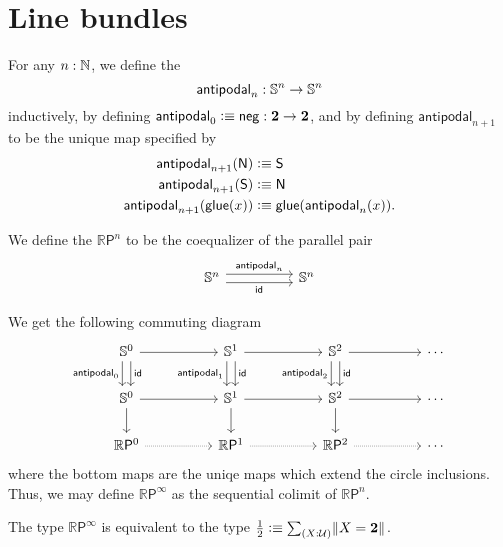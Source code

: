 \documentclass{article}
\newcommand{\projective}[1]{\mathbb{R}\mathsf{P}^{#1}}
\newcommand{\antipodal}[1]{\mathsf{antipodal}_{#1}}
\begin{document}
\section{Line bundles}

\begin{defn}
For any $n:\mathbb{N}$, we define the  
\begin{equation*}
\antipodal{n}:\Sn^n\to\Sn^n
\end{equation*} 
inductively, by defining $\antipodal{0}\defeq\mathsf{neg}:\bool\to\bool$, and by defining
$\antipodal{n+1}$ to be the unique map specified by
\begin{align*}
\antipodal{n+1}(\north) & \defeq\south \\
\antipodal{n+1}(\south) & \defeq\north \\
\ap{\antipodal{n+1}}{\glue(x)} & \defeq \glue(\antipodal{n}(x)).
\end{align*}
\end{defn}

\begin{defn}
We define the  $\projective{n}$ to be the coequalizer of the parallel pair
\begin{equation*}
\begin{tikzcd}[column sep=huge]
\Sn^n\arrow[r,yshift=.7ex,"\antipodal{n}"] \arrow[r,yshift=-.7ex,swap,"\idfunc"] & \Sn^n
\end{tikzcd}
\end{equation*}
\end{defn}

\begin{defn}
We get the following commuting diagram
\begin{equation*}
\begin{tikzcd}[column sep=huge]
\Sn^0 \arrow[r] \arrow[d,xshift=-.7ex,swap,"\mathsf{antipodal}_0"] \arrow[d,xshift=.7ex,"\idfunc"]
& \Sn^1 \arrow[r] \arrow[d,xshift=-.7ex,swap,"\mathsf{antipodal}_1"] \arrow[d,xshift=.7ex,"\idfunc"]
& \Sn^2 \arrow[r] \arrow[d,xshift=-.7ex,swap,"\mathsf{antipodal}_2"] \arrow[d,xshift=.7ex,"\idfunc"]
& \cdots \\
\Sn^0 \arrow[r] \arrow[d] & \Sn^1 \arrow[r] \arrow[d] & \Sn^2 \arrow[r] \arrow[d] & \cdots \\
\projective{0} \arrow[r,densely dotted] & \projective{1} \arrow[r,densely dotted] & \projective{2} \arrow[r,densely dotted] & \cdots
\end{tikzcd}
\end{equation*}
where the bottom maps are the uniqe maps which extend the circle inclusions.
Thus, we may define $\projective{\infty}$ as the sequential colimit of $\projective{n}$. 
\end{defn}

\begin{conj}
The type $\projective{\infty}$ is equivalent to the type $\frac{1}{2}\defeq\sm{X:\UU}\brck{X=\bool}$. 
\end{conj}

\printbibliography
\end{document}
